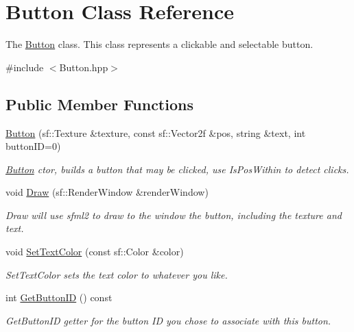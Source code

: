 \hypertarget{class_button}{\section{Button Class Reference}
\label{class_button}
}


The \hyperlink{class_button}{Button} class. This class represents a clickable and selectable button.  




{\ttfamily \#include $<$Button.\-hpp$>$}

\subsection*{Public Member Functions}
\begin{DoxyCompactItemize}
\item 
\hyperlink{class_button_aa4dd15f695a20943a6d7d773c7bb1d4e}{Button} (sf\-::\-Texture \&texture, const sf\-::\-Vector2f \&pos, string \&text, int button\-I\-D=0)
\begin{DoxyCompactList}\small\item\em \hyperlink{class_button}{Button} ctor, builds a button that may be clicked, use Is\-Pos\-Within to detect clicks. \end{DoxyCompactList}\item 
void \hyperlink{class_button_a002afec181e20098f3143583e66b1264}{Draw} (sf\-::\-Render\-Window \&render\-Window)
\begin{DoxyCompactList}\small\item\em Draw will use sfml2 to draw to the window the button, including the texture and text. \end{DoxyCompactList}\item 
void \hyperlink{class_button_a9f0b99d112108bae788b3be20a70d1d4}{Set\-Text\-Color} (const sf\-::\-Color \&color)
\begin{DoxyCompactList}\small\item\em Set\-Text\-Color sets the text color to whatever you like. \end{DoxyCompactList}\item 
int \hyperlink{class_button_a13681ae9a574971ab91bb26089e0b096}{Get\-Button\-I\-D} () const 
\begin{DoxyCompactList}\small\item\em Get\-Button\-I\-D getter for the button I\-D you chose to associate with this button. \end{DoxyCompactList}\item 

\end{DoxyCompactItemize}
